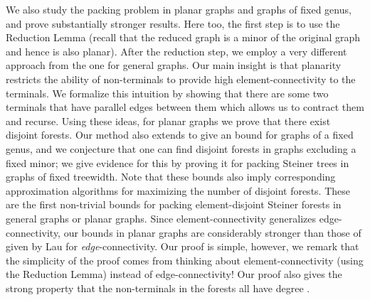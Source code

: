 \documentclass[11pt]{article}
\begin{document}
We also study the packing problem in planar graphs and graphs of fixed
genus, and prove substantially stronger results. Here too, the first
step is to use the Reduction Lemma (recall that the reduced graph is a
minor of the original graph and hence is also planar). After the
reduction step, we employ a very different approach from the one for
general graphs.  Our main insight is that planarity restricts the
ability of non-terminals to provide high element-connectivity to the
terminals. We formalize this intuition by showing that there are some
two terminals  that have  parallel edges between them
which allows us to contract them and recurse. Using these ideas, for
planar graphs we prove that there exist  disjoint
forests. Our method also extends to give an  bound for
graphs of a fixed genus, and we conjecture that one can find
 disjoint forests in graphs excluding a fixed minor; we
give evidence for this by proving it for packing Steiner trees in
graphs of fixed treewidth. Note that these bounds also imply
corresponding approximation algorithms for maximizing the number of
disjoint forests. These are the first non-trivial bounds for packing
element-disjoint Steiner forests in general graphs or planar
graphs. Since element-connectivity generalizes edge-connectivity, our
bounds in planar graphs are considerably stronger than those of given
by Lau \cite{Lau1,Lau2} for {\em edge}-connectivity. Our proof is
simple, however, we remark that the simplicity of the proof comes from
thinking about element-connectivity (using the Reduction Lemma)
instead of edge-connectivity! Our proof also gives the strong property
that the non-terminals in the forests all have degree .
\end{document}
